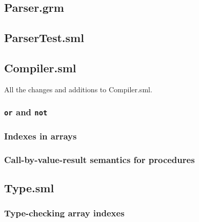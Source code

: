 \documentclass{article}
\newcommand{\Cfile}[4][SML]{ }
\begin{document}
\begin{appendix}
\subsection{Parser.grm}
    

\subsection{ParserTest.sml}
    

\subsection{Compiler.sml}

All the changes and additions to Compiler.sml.

\subsubsection{\texttt{or} and \texttt{not}}

\Cfile{Compiler.sml}{253}{270}
%    
\subsubsection{Indexes in arrays}
\Cfile{Compiler.sml}{465}{521}
%    
\subsubsection{Call-by-value-result semantics for procedures}
\Cfile{Compiler.sml}{433}{454}
%    
\Cfile{Compiler.sml}{574}{582}
%    
\Cfile{Compiler.sml}{652}{692}
%    

\subsection{Type.sml}
\subsubsection{Type-checking array indexes}
\Cfile{Type.sml}{159}{177}
%    

\end{appendix}
\end{document}
